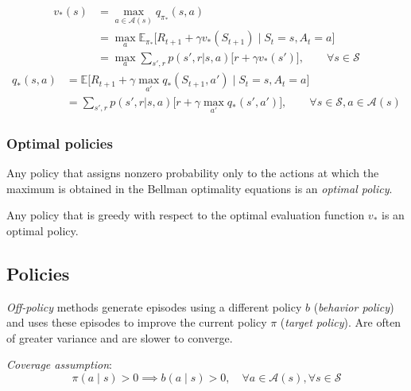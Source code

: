 \begin{equation}
    \begin{aligned}
        v_*(s)
         & =
        \max_{a \in \mathcal{A}(s)} q_{\pi_*}(s, a)
        \\ & =
        \max_{a} \mathbb{E}_{\pi_*} \big[ R_{t+1} + \gamma v_*(S_{t+1}) \;\big|\; S_t = s, A_t = a \big]
        \\ & =
        \max_{a} \sum_{s', r} p(s', r | s, a) \Big[ r + \gamma v_*(s') \Big]
        , \qquad \forall s \in \mathcal{S}
    \end{aligned}
\end{equation}
\begin{equation}
    \begin{aligned}
        q_*(s, a)
         & =
        \mathbb{E} \big[ R_{t+1} + \gamma \max_{a'} q_*(S_{t+1}, a') \;\big|\; S_t = s, A_t = a \big]
        \\ & =
        \sum_{s', r} p(s', r | s, a) \Big[ r + \gamma \max_{a'} q_*(s', a') \Big]
        , \qquad \forall s \in \mathcal{S}, a \in \mathcal{A}(s)
    \end{aligned}
\end{equation}

\subsubsection{Optimal policies}

Any policy that assigns nonzero probability only to the actions at which the maximum is obtained in the Bellman optimality equations is an \textit{optimal policy}.

Any policy that is greedy with respect to the
optimal evaluation function \( v_* \) is an optimal policy.

\subsection{Policies}

\textit{Off-policy} methods generate episodes using a different policy \( b \) (\textit{behavior policy}) and uses these episodes to improve the current policy \( \pi \) (\textit{target policy}).
Are often of greater variance and are slower to converge.

\textit{Coverage assumption}:
\begin{equation}
    \pi(a \mid s) > 0 \implies b(a \mid s) > 0, \quad \forall a \in \mathcal{A}(s), \forall s \in \mathcal{S}
\end{equation}

